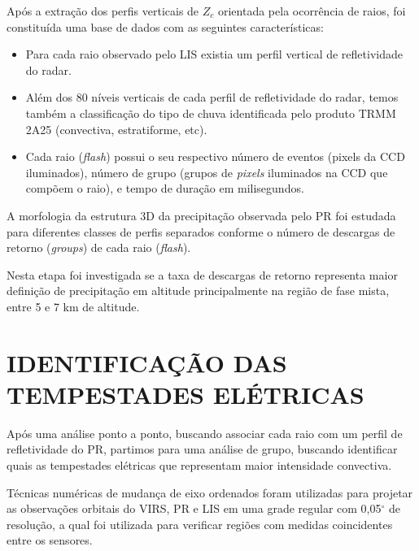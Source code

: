 
Após a extração dos perfis verticais de $Z_c$ orientada pela ocorrência de raios, foi constituída uma base de dados com as seguintes características:

\begin{itemize}
\item Para cada raio observado pelo LIS existia um perfil vertical de refletividade do radar.
\item Além dos 80 níveis verticais de cada perfil de refletividade do radar, temos também a classificação do tipo de chuva identificada pelo produto TRMM 2A25 (convectiva, estratiforme, etc).
\item Cada raio (\textit{flash}) possui o seu respectivo número de eventos (pixels da CCD iluminados), número de grupo (grupos de \textit{pixels} iluminados na CCD que compõem o raio), e tempo de duração em milisegundos. 
\end{itemize}

A morfologia da estrutura 3D da precipitação observada pelo PR foi estudada para diferentes classes de perfis separados conforme o número de descargas de retorno (\textit{groups}) de cada raio (\textit{flash}). 

Nesta etapa foi investigada se a taxa de descargas de retorno representa maior definição de precipitação em altitude principalmente na região de fase mista, entre 5 e 7 km de altitude. 

\section{IDENTIFICAÇÃO DAS TEMPESTADES ELÉTRICAS}

Após uma análise ponto a ponto, buscando associar cada raio com um perfil de refletividade do PR, partimos para uma análise de grupo, buscando identificar quais as tempestades elétricas que representam maior intensidade convectiva.

Técnicas numéricas de mudança de eixo ordenados foram utilizadas para projetar as
observações orbitais do VIRS, PR e LIS em uma grade regular com 0,05$^{\circ}$ de resolução, a qual foi utilizada para verificar regiões com medidas coincidentes entre os sensores.

